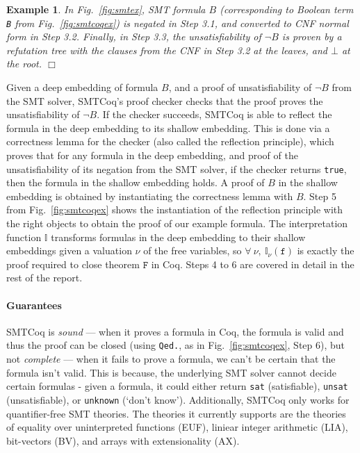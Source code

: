\documentclass{article}
\newtheorem{example}{Example}[section]
\begin{document}
	\begin{example} 
		\em In Fig.~\ref{fig:smtex}, 
		SMT formula $B$ (corresponding
		to Boolean term \texttt{B}
		from Fig.~\ref{fig:smtcoqex}) is 
		negated in Step 3.1, and converted 
		to CNF normal form in Step 3.2.
		Finally, in Step 3.3, the 
		unsatisfiability of $\neg B$ is 
		proven by a refutation tree with 
		the clauses from the CNF in Step 3.2
		at the leaves, and $\bot$ at the 
		root. \hfill $\Box$
	\end{example}

	Given a deep embedding of 
	formula $B$, and a proof of 
	unsatisfiability of $\neg B$
	from the SMT solver, SMTCoq's proof 
	checker checks that the proof proves
	the unsatisfiability of $\neg B$. If the 
	checker succeeds, SMTCoq is able to 
	reflect the formula in 
	the deep embedding to its shallow 
	embedding. This is done via a 
	correctness lemma for the checker
	(also called the reflection principle),
	which proves that for any 
	formula in the deep embedding, and 
	proof of the unsatisfiability of its 
	negation from the SMT solver, if 
	the checker returns \texttt{true}, 
	then the formula in 
	the shallow embedding holds. A 
	proof of $B$ in the shallow 
	embedding is obtained by instantiating 
	the correctness lemma with $B$.
	Step 5 from Fig.~\ref{fig:smtcoqex} 
	shows the instantiation of 
	the reflection principle with 
	the right objects to obtain the 
	proof of our example formula. 
	The interpretation function
	$\mathbb{I}$ transforms 
	formulas in the deep embedding
	to their shallow embeddings
	given a valuation $\nu$ of the 
	free variables, so 
	$\forall\ \nu,\ 
	\mathbb{I}_{\nu}(\texttt{f})$
	is exactly the proof required 
	to close theorem $\texttt{F}$
	in Coq. Steps 4 to 6 are covered
	in detail in the rest of the report.
	
	\paragraph{Guarantees}
	SMTCoq is \textit{sound} ---
	when it proves a formula in Coq, the 
	formula is valid and thus the proof
	can be closed (using \texttt{Qed.},
	as in Fig.~\ref{fig:smtcoqex}, 
	Step 6), but 
	not \textit{complete} --- when it 
	fails to prove a formula, we can't 
	be certain that the formula isn't 
	valid. This is because, the underlying 
	SMT solver cannot decide certain 
	formulas - given a formula, it could 
	either return \texttt{sat} 
	(satisfiable), \texttt{unsat} 
	(unsatisfiable), or 
	\texttt{unknown} (`don't know').
	Additionally, SMTCoq only works for 
	quantifier-free SMT theories. The 
	theories it currently supports 
	are the theories of equality over
	uninterpreted functions (EUF), 
	liniear integer arithmetic (LIA),
	bit-vectors (BV), and arrays with
	extensionality (AX).
	
\end{document}

